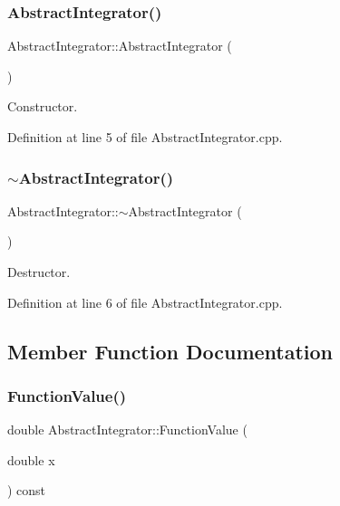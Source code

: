 \subsubsection{\texorpdfstring{Abstract\+Integrator()}{AbstractIntegrator()}}
{\footnotesize\ttfamily Abstract\+Integrator\+::\+Abstract\+Integrator (\begin{DoxyParamCaption}{ }\end{DoxyParamCaption})}



Constructor. 



Definition at line 5 of file Abstract\+Integrator.\+cpp.

\mbox{\label{class_abstract_integrator_addc528450d3f1d6e5d2cbd81e7d545e0}} 
\subsubsection{\texorpdfstring{$\sim$\+Abstract\+Integrator()}{~AbstractIntegrator()}}
{\footnotesize\ttfamily Abstract\+Integrator\+::$\sim$\+Abstract\+Integrator (\begin{DoxyParamCaption}{ }\end{DoxyParamCaption})\hspace{0.3cm}{\ttfamily [virtual]}}



Destructor. 



Definition at line 6 of file Abstract\+Integrator.\+cpp.



\subsection{Member Function Documentation}
\mbox{\label{class_abstract_integrator_a6262731b81f3ad7e984ba354b4601356}} 
\subsubsection{\texorpdfstring{Function\+Value()}{FunctionValue()}}
{\footnotesize\ttfamily double Abstract\+Integrator\+::\+Function\+Value (\begin{DoxyParamCaption}\item[{double}]{x }\end{DoxyParamCaption}) const}



